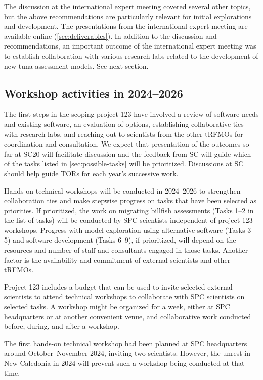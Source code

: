 \documentclass{SCreport}
\begin{document}
The discussion at the international expert meeting covered several other topics,
but the above recommendations are particularly relevant for initial explorations
and development. The presentations from the international expert meeting are
available online (\autoref{sec:deliverables}). In addition to the discussion and
recommendations, an important outcome of the international expert meeting was to
establish collaboration with various research labs related to the development of
new tuna assessment models. See next section.

\subsection{Workshop activities in 2024--2026}

The first steps in the scoping project 123 have involved a review of software
needs and existing software, an evaluation of options, establishing
collaborative ties with research labs, and reaching out to scientists from the
other tRFMOs for coordination and consultation. We expect that presentation of
the outcomes so far at SC20 will facilitate discussion and the feedback from SC
will guide which of the tasks listed in \autoref{sec:possible-tasks} will be
prioritized. Discussions at SC should help guide TORs for each year's successive
work.

Hands-on technical workshops will be conducted in 2024--2026 to strengthen
collaboration ties and make stepwise progress on tasks that have been selected
as priorities. If prioritized, the work on migrating billfish assessments (Tasks
1--2 in the list of tasks) will be conducted by SPC scientists independent of
project 123 workshops. Progress with model exploration using alternative
software (Tasks 3--5) and software development (Tasks 6--9), if prioritized,
will depend on the resources and number of staff and consultants engaged in
those tasks. Another factor is the availability and commitment of external
scientists and other tRFMOs.

\newpage

Project 123 includes a budget that can be used to invite selected external
scientists to attend technical workshops to collaborate with SPC scientists on
selected tasks. A workshop might be organized for a week, either at SPC
headquarters or at another convenient venue, and collaborative work conducted
before, during, and after a workshop.

The first hands-on technical workshop had been planned at SPC headquarters
around October--November 2024, inviting two scientists. However, the unrest in
New Caledonia in 2024 will prevent such a workshop being conducted at that time.
\end{document}
